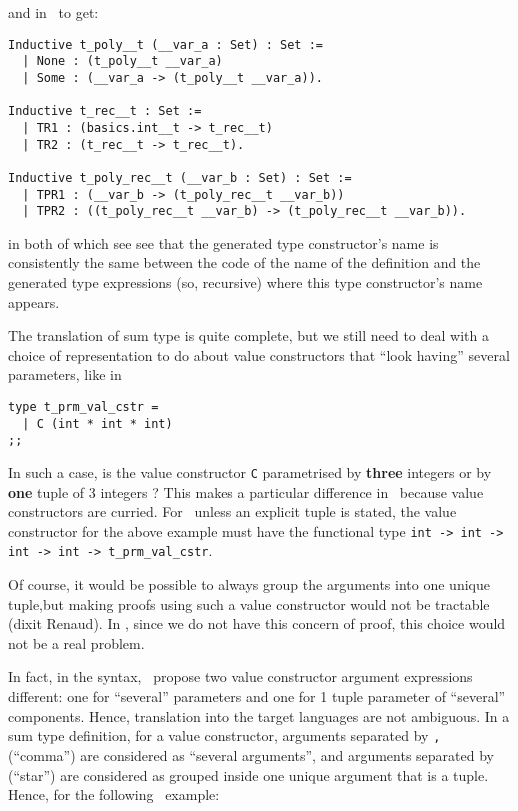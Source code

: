 \noindent and in \coq\ to get:

{\footnotesize
\begin{lstlisting}[language=MyCoq, title=Sum type generated in \coq]
Inductive t_poly__t (__var_a : Set) : Set := 
  | None : (t_poly__t __var_a)
  | Some : (__var_a -> (t_poly__t __var_a)).

Inductive t_rec__t : Set := 
  | TR1 : (basics.int__t -> t_rec__t)
  | TR2 : (t_rec__t -> t_rec__t).

Inductive t_poly_rec__t (__var_b : Set) : Set := 
  | TPR1 : (__var_b -> (t_poly_rec__t __var_b))
  | TPR2 : ((t_poly_rec__t __var_b) -> (t_poly_rec__t __var_b)).
\end{lstlisting}}

in both of which see see that the generated type constructor's name is
consistently the same between the code of the name of the definition
and the generated type expressions (so, recursive) where this type
constructor's name appears.

\medskip
\label{sum-value-cstr-tuple-versus-several-args}
The translation of sum type is quite complete, but we still need to
deal with a choice of representation to do about value
constructors that ``look having'' several parameters, like in

{\footnotesize
\begin{lstlisting}[title=Value constructor parameterised by
  ``several'' arguments]
type t_prm_val_cstr =
  | C (int * int * int)
;;
\end{lstlisting}}

In such a case, is the value constructor {\tt C} parametrised by
{\bf three} integers or by {\bf one} tuple of 3 integers ? This makes
a particular difference in \coq\ because value constructors are
curried. For \coq\, unless an explicit tuple is stated, the value
constructor for the above example must have the functional type
{\tt int -> int -> int -> int -> t\_prm\_val\_cstr}.

Of course, it would be possible to always group the arguments into one
unique tuple,but making proofs using such a value constructor would
not be tractable (dixit Renaud). In \ocaml, since we do not have this
concern of proof, this choice would not be a real problem.

In fact, in the syntax, \focalize\ propose two value constructor
argument expressions different: one for ``several'' parameters and one
for 1 tuple parameter of ``several'' components. Hence, translation
into the target languages are not ambiguous. In a sum type definition,
for a value constructor, arguments separated by {\tt ,} (``comma'')
are considered as ``several arguments'', and arguments separated by
{\tt *} (``star'') are considered as grouped inside one unique
argument that is a tuple. Hence, for the following \focalize\ example:

